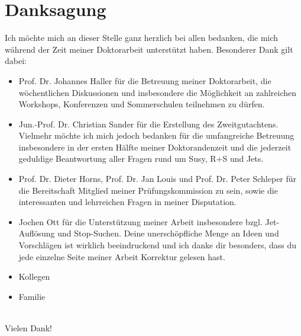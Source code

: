 \section*{Danksagung}
Ich m\"ochte mich an dieser Stelle ganz herzlich bei allen bedanken, die mich w\"ahrend der Zeit meiner Doktorarbeit unterst\"utzt haben. Besonderer Dank gilt dabei:
\begin{itemize}
\item Prof. Dr. Johannes Haller f\"ur die Betreuung meiner Doktorarbeit, die w\"ochentlichen Diskussionen und insbesondere die M\"oglichkeit an zahlreichen Workshops, Konferenzen und Sommerschulen teilnehmen zu d\"urfen.    
\item Jun.-Prof. Dr. Christian Sander f\"ur die Erstellung des Zweitgutachtens. Vielmehr m\"ochte ich mich jedoch bedanken f\"ur die umfangreiche Betreuung insbesondere in der ersten H\"alfte meiner Doktorandenzeit und die jederzeit geduldige Beantwortung aller Fragen rund um Susy, R+S und Jets.
\item Prof. Dr. Dieter Horns, Prof. Dr. Jan Louis und Prof. Dr. Peter Schleper f\"ur die Bereitschaft Mitglied meiner Pr\"ufungskommission zu sein, sowie die interessanten und lehrreichen Fragen in meiner Disputation.
\item Jochen Ott f\"ur die Unterst\"utzung meiner Arbeit insbesondere bzgl. Jet-Aufl\"osung und Stop-Suchen. Deine unersch\"opfliche Menge an Ideen und Vorschl\"agen ist wirklich beeindruckend und ich danke dir besonders, dass du jede einzelne Seite meiner Arbeit Korrektur gelesen hast.
\item Kollegen
\item Familie
\end{itemize}
\ \\
Vielen Dank!
